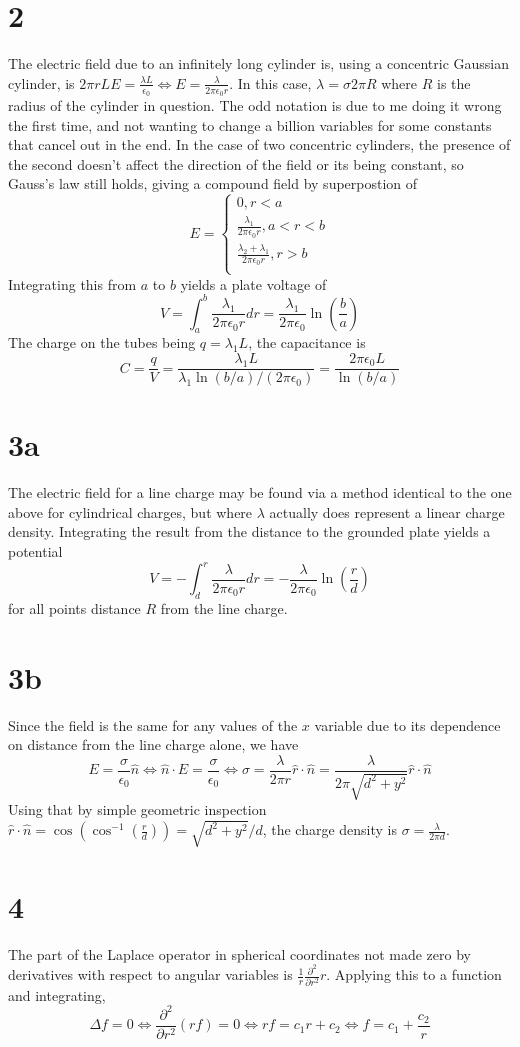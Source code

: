 \documentclass{article}
\begin{document}
\section*{2}
The electric field due to an infinitely long cylinder is, using a concentric Gaussian cylinder, is $2\pi rLE=\frac{\lambda L}{\epsilon_0}\Leftrightarrow E=\frac{\lambda}{2\pi\epsilon_0r}$. In this case, $\lambda=\sigma 2\pi R$ where $R$ is the radius of the cylinder in question. The odd notation is due to me doing it wrong the first time, and not wanting to change a billion variables for some constants that cancel out in the end.
In the case of two concentric cylinders, the presence of the second doesn't affect the direction of the field or its being constant, so Gauss's law still holds, giving a compound field by superpostion of
\[E=\begin{cases}
    0, r < a \\
    \frac{\lambda_1}{2\pi\epsilon_0 r}, a<r<b \\
    \frac{\lambda_2+\lambda_1}{2\pi\epsilon_0 r}, r>b \\
  \end{cases}\]
Integrating this from $a$ to $b$ yields a plate voltage of
\[V=\int_a^b\frac{\lambda_1}{2\pi\epsilon_0 r}dr=\frac{\lambda_1}{2\pi\epsilon_0}\ln(\frac{b}{a})\]
The charge on the tubes being $q=\lambda_1 L$, the capacitance is
\[C=\frac{q}{V}=\frac{\lambda_1 L}{\lambda_1\ln(b/a)/(2\pi\epsilon_0)}=\frac{2\pi\epsilon_0 L}{\ln(b/a)}\]

\section*{3a}
The electric field for a line charge may be found via a method identical to the one above for cylindrical charges, but where $\lambda$ actually does represent a linear charge density.
Integrating the result from the distance to the grounded plate yields a potential
\[V=-\int_d^r\frac{\lambda}{2\pi\epsilon_0 r}dr=-\frac{\lambda}{2\pi\epsilon_0}\ln(\frac{r}{d})\]
for all points distance $R$ from the line charge.
\section*{3b}
Since the field is the same for any values of the $x$ variable due to its dependence on distance from the line charge alone, we have
\[E=\frac{\sigma}{\epsilon_0}\hat{n}\Leftrightarrow{\hat{n}}\cdot E=\frac{\sigma}{\epsilon_0}\Leftrightarrow \sigma = \frac{\lambda}{2\pi r}\hat{r}\cdot\hat{n}=\frac{\lambda}{2\pi \sqrt{d^2+y^2}}\hat{r}\cdot \hat{n}\]
Using that by simple geometric inspection $\hat{r}\cdot\hat{n}=\cos(\cos^{-1}(\frac{r}{d}))=\sqrt{d^2+y^2}/d$, the charge density is $\sigma=\frac{\lambda}{2\pi d}$.
\section*{4}
The part of the Laplace operator in spherical coordinates not made zero by derivatives with respect to angular variables is $\frac{1}{r}\frac{\partial^2}{\partial r^2}r$.
Applying this to a function and integrating,
\[\Delta f=0\Leftrightarrow \frac{\partial^2}{\partial r^2}(rf)=0\Leftrightarrow rf = c_1r+c_2\Leftrightarrow f=c_1+\frac{c_2}{r}\]
\end{document}
